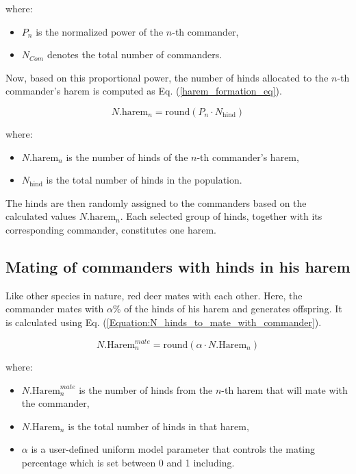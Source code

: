 \documentclass[pdflatex,sn-mathphys-num]{sn-jnl}%
\begin{document}
\noindent where:
\begin{itemize}
    \item \( P_n \) is the normalized power of the \( n \)-th commander,
    \item \( N_{Com} \) denotes the total number of commanders.
\end{itemize}

Now, based on this proportional power, the number of hinds allocated to the \( n \)-th commander’s harem is computed as Eq. (\ref{harem_formation_eq}).

\begin{equation}\label{harem_formation_eq}
N.{\text{harem}_n} = \text{round}(P_n \cdot N_{\text{hind}})
\end{equation}

\noindent where:
\begin{itemize}
    \item \( N.{\text{harem}_n} \) is the number of hinds of the \( n \)-th commander's harem,
    \item \( N_{\text{hind}} \) is the total number of hinds in the population.
\end{itemize}

The hinds are then randomly assigned to the commanders based on the calculated values \( N.{\text{harem}_n} \). Each selected group of hinds, together with its corresponding commander, constitutes one harem.

\subsection{Mating of commanders with hinds in his harem}\label{subsec4.6}
Like other species in nature, red deer mates with each other. Here, the commander mates with $\alpha$\% of the hinds of his harem and generates offspring. It is calculated using Eq. (\ref{Equation:N_hinds_to_mate_with_commander}).

\begin{equation}\label{Equation:N_hinds_to_mate_with_commander}
N.{\text{Harem}_n^{mate}} = \text{round}(\alpha \cdot N.{\text{Harem}_n})
\end{equation}

\noindent where:
\begin{itemize}
    \item $N.{\text{Harem}_n^{mate}}$ is the number of hinds from the $n$-th harem that will mate with the commander,
    \item $N.{\text{Harem}_n}$ is the total number of hinds in that harem,
    \item $\alpha$ is a user-defined uniform model parameter that controls the mating percentage which is set between 0 and 1 including.
\end{itemize}
\end{document}
